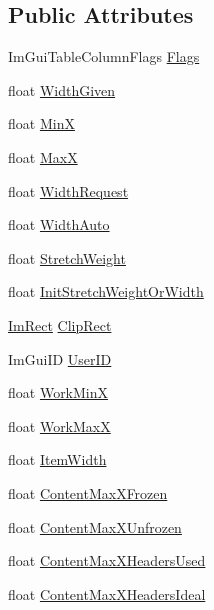 \subsection*{Public Attributes}
\begin{DoxyCompactItemize}
\item 
Im\+Gui\+Table\+Column\+Flags \hyperlink{structImGuiTableColumn_a46f41e471f2be0a226fef2782d8318e3}{Flags}
\item 
float \hyperlink{structImGuiTableColumn_a691d733038d15e59701033af359f5235}{Width\+Given}
\item 
float \hyperlink{structImGuiTableColumn_a7c1bb1f414d4bccf97cf0c1f9d73fcf2}{MinX}
\item 
float \hyperlink{structImGuiTableColumn_a934fd6769cb9a4d9c0f081acc78c8c0a}{MaxX}
\item 
float \hyperlink{structImGuiTableColumn_a5c620f16932315085b34326466eee489}{Width\+Request}
\item 
float \hyperlink{structImGuiTableColumn_a3cbce4e74538399b950ea94570c47ffd}{Width\+Auto}
\item 
float \hyperlink{structImGuiTableColumn_a1e76d6659e59f751c863f360cdb6bdb9}{Stretch\+Weight}
\item 
float \hyperlink{structImGuiTableColumn_a3b3ca3f9832c94586083f40b4688b92e}{Init\+Stretch\+Weight\+Or\+Width}
\item 
\hyperlink{structImRect}{Im\+Rect} \hyperlink{structImGuiTableColumn_ac4ea2c21bd389213c95bfb4f85e88aa9}{Clip\+Rect}
\item 
Im\+Gui\+ID \hyperlink{structImGuiTableColumn_a41e54f7b02880ad716544c0928338443}{User\+ID}
\item 
float \hyperlink{structImGuiTableColumn_ad16a4e87ef68cfe781678a078b27f601}{Work\+MinX}
\item 
float \hyperlink{structImGuiTableColumn_a54f5dfe34300039711393b058fb9a867}{Work\+MaxX}
\item 
float \hyperlink{structImGuiTableColumn_af3d247d34fe57621c44db385ab087855}{Item\+Width}
\item 
float \hyperlink{structImGuiTableColumn_a2f3464e809b6952d1a429a7bc27b922d}{Content\+Max\+X\+Frozen}
\item 
float \hyperlink{structImGuiTableColumn_ad2f4bb071770649848fab1c64a79c862}{Content\+Max\+X\+Unfrozen}
\item 
float \hyperlink{structImGuiTableColumn_a9936422dc6eb6e2cb36c068cb62c657f}{Content\+Max\+X\+Headers\+Used}
\item 
float \hyperlink{structImGuiTableColumn_a05dbc5998ea7271a51d4acb15c6c4a84}{Content\+Max\+X\+Headers\+Ideal}

\end{DoxyCompactItemize}
